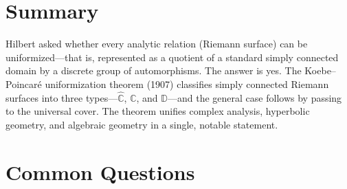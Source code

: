 \section{Summary}

Hilbert asked whether every analytic relation (Riemann surface) can be uniformized---that is, represented as a quotient of a standard simply connected domain by a discrete group of automorphisms. The answer is yes. The Koebe--Poincar\'e uniformization theorem (1907) classifies simply connected Riemann surfaces into three types---$\widehat{\mathbb{C}}$, $\mathbb{C}$, and $\mathbb{D}$---and the general case follows by passing to the universal cover. The theorem unifies complex analysis, hyperbolic geometry, and algebraic geometry in a single, notable statement.

\section*{Common Questions}

